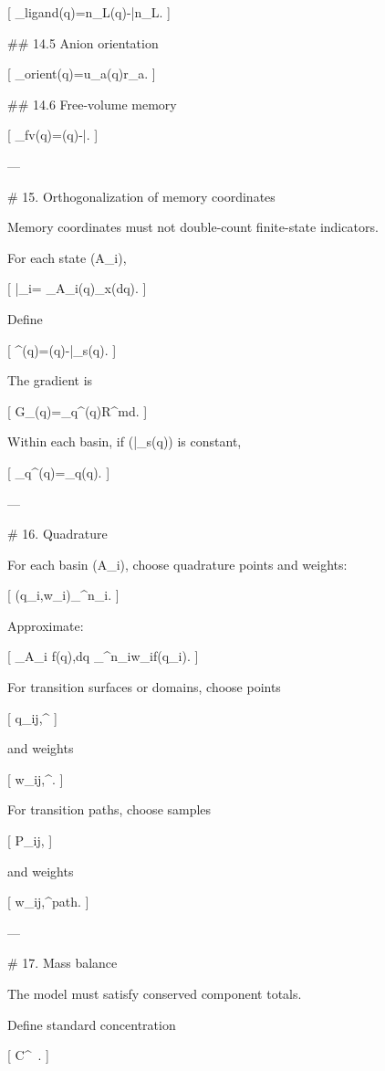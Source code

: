 [
\psi_{\rm ligand}(q)=n_{\ell L}(q)-\bar n_{\ell L}.
]

## 14.5 Anion orientation

[
\psi_{\rm orient}(q)=u_a(q)\cdot\hat r_{\ell a}.
]

## 14.6 Free-volume memory

[
\psi_{\rm fv}(q)=\varphi(q)-\bar\varphi.
]

---

# 15. Orthogonalization of memory coordinates

Memory coordinates must not double-count finite-state indicators.

For each state (A_i),

[
\bar\Psi_i=
\int_{A_i}\Psi(q)\rho_x(\mathrm dq).
]

Define

[
\Psi^\perp(q)=\Psi(q)-\bar\Psi_{s(q)}.
]

The gradient is

[
G_\psi(q)=\nabla_q\Psi^\perp(q)\in\mathbb R^{m\times d}.
]

Within each basin, if (\bar\Psi_{s(q)}) is constant,

[
\nabla_q\Psi^\perp(q)=\nabla_q\Psi(q).
]

---

# 16. Quadrature

For each basin (A_i), choose quadrature points and weights:

[
{(q_{i\ell},w_{i\ell})}_{}^{n_i}.
]

Approximate:

[
\int_{A_i} f(q),\mathrm dq
\approx
\sum_{}^{n_i}w_{i\ell}f(q_{i\ell}).
]

For transition surfaces or domains, choose points

[
q_{ij,\ell}^{\Sigma}
]

and weights

[
w_{ij,\ell}^{\Sigma}.
]

For transition paths, choose samples

[
\Delta P_{ij,\ell}
]

and weights

[
w_{ij,\ell}^{\rm path}.
]

---

# 17. Mass balance

The model must satisfy conserved component totals.

Define standard concentration

[
C^\ .
]

